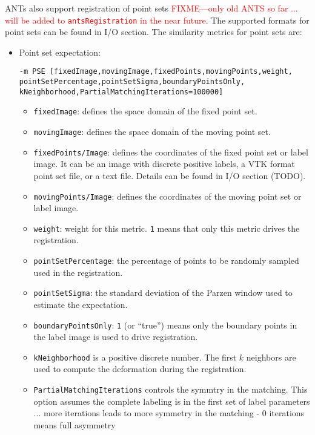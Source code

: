 ANTs also support registration of point sets
\textcolor{red}{FIXME---only old ANTS so far ... will be added to
  \texttt{antsRegistration} in the near future}. The supported formats for point sets can be found in I/O section. The similarity metrics for point sets are:
\begin{itemize}
    \item Point set expectation: 
     \begin{verbatim}
-m PSE [fixedImage,movingImage,fixedPoints,movingPoints,weight,
pointSetPercentage,pointSetSigma,boundaryPointsOnly,
kNeighborhood,PartialMatchingIterations=100000]
    \end{verbatim}
    \begin{itemize}
        \item \verb"fixedImage": defines the space domain of the fixed point set.
        \item \verb"movingImage": defines the space domain of the moving point set.
        \item \verb"fixedPoints/Image": defines the coordinates of the fixed point set or label image. It can be an image with discrete positive labels, a VTK format point set file, or a text file. Details can be found in I/O section (TODO).
        \item \verb"movingPoints/Image": defines the coordinates of the moving point set or label image. 
        \item \verb"weight": weight for this metric. \verb"1" means that only this metric drives the registration.
        \item \verb"pointSetPercentage": the percentage of points to be randomly sampled used in the registration.
        \item \verb"pointSetSigma": the standard deviation of the Parzen window used to estimate the expectation. 
        \item \verb"boundaryPointsOnly":  \verb"1" (or ``true'') means only the boundary points in the label image is used to drive registration.
        \item \verb"kNeighborhood" is a positive discrete number. The first $k$ neighbors are used to compute the deformation during the registration. 
        \item \verb"PartialMatchingIterations" controls the symmtry in the matching. This option assumes the complete labeling is in the first set of label parameters ... more iterations leads to more symmetry in the matching  - 0 iterations means full asymmetry 
    \end{itemize}


\end{itemize}

